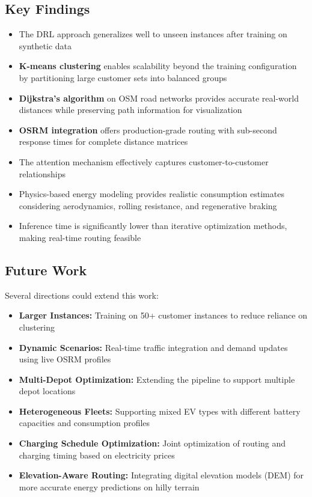 \documentclass[11pt,a4paper]{article}
\begin{document}
\subsection{Key Findings}

\begin{itemize}
    \item The DRL approach generalizes well to unseen instances after training on synthetic data
    \item \textbf{K-means clustering} enables scalability beyond the training configuration by partitioning large customer sets into balanced groups
    \item \textbf{Dijkstra's algorithm} on OSM road networks provides accurate real-world distances while preserving path information for visualization
    \item \textbf{OSRM integration} offers production-grade routing with sub-second response times for complete distance matrices
    \item The attention mechanism effectively captures customer-to-customer relationships
    \item Physics-based energy modeling provides realistic consumption estimates considering aerodynamics, rolling resistance, and regenerative braking
    \item Inference time is significantly lower than iterative optimization methods, making real-time routing feasible
\end{itemize}

\subsection{Future Work}

Several directions could extend this work:
\begin{itemize}
    \item \textbf{Larger Instances:} Training on 50+ customer instances to reduce reliance on clustering
    \item \textbf{Dynamic Scenarios:} Real-time traffic integration and demand updates using live OSRM profiles
    \item \textbf{Multi-Depot Optimization:} Extending the pipeline to support multiple depot locations
    \item \textbf{Heterogeneous Fleets:} Supporting mixed EV types with different battery capacities and consumption profiles
    \item \textbf{Charging Schedule Optimization:} Joint optimization of routing and charging timing based on electricity prices
    \item \textbf{Elevation-Aware Routing:} Integrating digital elevation models (DEM) for more accurate energy predictions on hilly terrain
\end{itemize}
\end{document}
